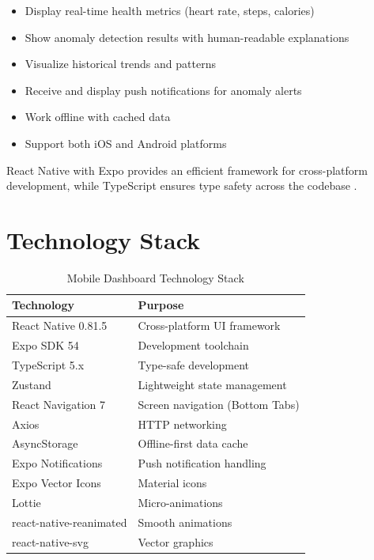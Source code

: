 \documentclass[conference]{IEEEtran}
\begin{document}
\begin{itemize}
    \item Display real-time health metrics (heart rate, steps, calories)
    \item Show anomaly detection results with human-readable explanations
    \item Visualize historical trends and patterns
    \item Receive and display push notifications for anomaly alerts
    \item Work offline with cached data
    \item Support both iOS and Android platforms
\end{itemize}

React Native with Expo provides an efficient framework for cross-platform development, while TypeScript ensures type safety across the codebase \cite{react_native}.

\section{Technology Stack}

\begin{table}[H]
\centering
\caption{Mobile Dashboard Technology Stack}
\label{tab:tech_stack}
\begin{tabular}{ll}
\toprule
\textbf{Technology} & \textbf{Purpose} \\
\midrule
React Native 0.81.5 & Cross-platform UI framework \\
Expo SDK 54 & Development toolchain \\
TypeScript 5.x & Type-safe development \\
Zustand & Lightweight state management \\
React Navigation 7 & Screen navigation (Bottom Tabs) \\
Axios & HTTP networking \\
AsyncStorage & Offline-first data cache \\
Expo Notifications & Push notification handling \\
Expo Vector Icons & Material icons \\
Lottie & Micro-animations \\
react-native-reanimated & Smooth animations \\
react-native-svg & Vector graphics \\
\bottomrule
\end{tabular}
\end{table}
\end{document}
